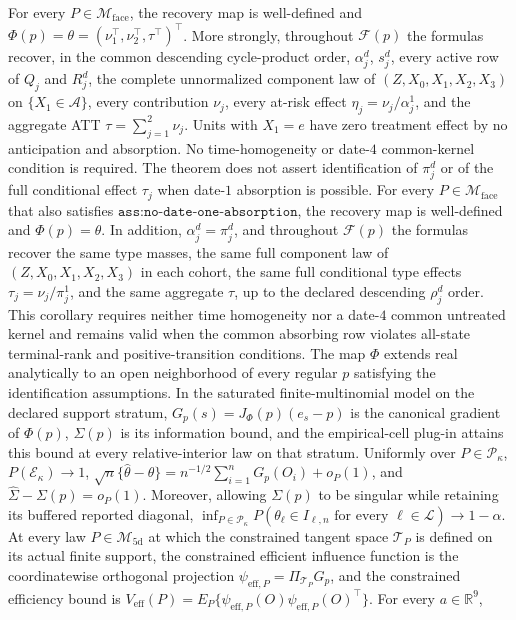 For every \(P\in\mathcal M_{\mathrm{face}}\), the recovery map is well-defined and \(\Phi(p)=\theta=(\nu_1^\top,\nu_2^\top,\tau^\top)^\top\).  More strongly, throughout \(\mathcal F(p)\) the formulas recover, in the common descending cycle-product order, \(\alpha_j^d\), \(s_j^d\), every active row of \(Q_j\) and \(R_j^d\), the complete unnormalized component law of \((Z,X_0,X_1,X_2,X_3)\) on \(\{X_1\in\mathcal A\}\), every contribution \(\nu_j\), every at-risk effect \(\eta_j=\nu_j/\alpha_j^1\), and the aggregate ATT \(\tau=\sum_{j=1}^2\nu_j\).  Units with \(X_1=e\) have zero treatment effect by no anticipation and absorption.  No time-homogeneity or date-\(4\) common-kernel condition is required.  The theorem does not assert identification of \(\pi_j^d\) or of the full conditional effect \(\tau_j\) when date-\(1\) absorption is possible.
For every \(P\in\mathcal M_{\mathrm{face}}\) that also satisfies \(\texttt{ass:no-date-one-absorption}\), the recovery map is well-defined and \(\Phi(p)=\theta\).  In addition, \(\alpha_j^d=\pi_j^d\), and throughout \(\mathcal F(p)\) the formulas recover the same type masses, the same full component law of \((Z,X_0,X_1,X_2,X_3)\) in each cohort, the same full conditional type effects \(\tau_j=\nu_j/\pi_j^1\), and the same aggregate \(\tau\), up to the declared descending \(\rho_j^d\) order.  This corollary requires neither time homogeneity nor a date-\(4\) common untreated kernel and remains valid when the common absorbing row violates all-state terminal-rank and positive-transition conditions.
The map \(\Phi\) extends real analytically to an open neighborhood of every regular \(p\) satisfying the identification assumptions.  In the saturated finite-multinomial model on the declared support stratum, \(G_p(s)=J_{\Phi}(p)(e_s-p)\) is the canonical gradient of \(\Phi(p)\), \(\Sigma(p)\) is its information bound, and the empirical-cell plug-in attains this bound at every relative-interior law on that stratum.
Uniformly over \(P\in\mathcal P_{\kappa}\), \(P(\mathcal E_{\kappa})\to1\), \(\sqrt n\{\widehat\theta-\theta\}=n^{-1/2}\sum_{i=1}^nG_p(O_i)+o_P(1)\), and \(\widehat\Sigma-\Sigma(p)=o_P(1)\).  Moreover, allowing \(\Sigma(p)\) to be singular while retaining its buffered reported diagonal, \(\inf_{P\in\mathcal P_{\kappa}}P(\theta_\ell\in I_{\ell,n}\text{ for every }\ell\in\mathcal L)\to1-\alpha\).
At every law \(P\in\mathcal M_{\mathrm{5d}}\) at which the constrained tangent space \(\mathcal T_P\) is defined on its actual finite support, the constrained efficient influence function is the coordinatewise orthogonal projection \(\psi_{\mathrm{eff},P}=\Pi_{\mathcal T_P}G_p\), and the constrained efficiency bound is \(V_{\mathrm{eff}}(P)=E_P\{\psi_{\mathrm{eff},P}(O)\psi_{\mathrm{eff},P}(O)^\top\}\).  For every \(a\in\mathbb R^9\),
